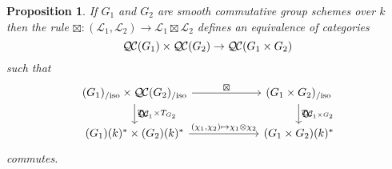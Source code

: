 \documentclass{amsart}
\theoremstyle{plain}
\newtheorem{proposition}[theorem]{Proposition}
\theoremstyle{definition}
\theoremstyle{remark}
\newcommand{\Fq}{k}
\newcommand{\qcs}[1]{{\mathcal{#1}}}
\newcommand{\QC}{{\mathcal{Q\hskip-0.8pt C}}}
\newcommand{\QCiso}[1]{\QC(#1)_{/\text{iso}}}
\newcommand{\TrFrob}[1]{T_{#1}}
\begin{document}

\begin{proposition}\label{prop:product}
If $G_1$ and $G_2$ are smooth commutative group schemes over $\Fq$ then the rule
$\boxtimes : (\qcs{L}_1,\qcs{L}_2)\to \qcs{L}_1\boxtimes\qcs{L}_2$ defines an equivalence of categories
\[
\QC(G_1)\times \QC(G_2) \to \QC(G_1\times G_2)
\]
such that
\[
\begin{tikzcd}[column sep=60]
\arrow{d}{\TrFrob{G_1} \times \TrFrob{G_2}} \QCiso{G_1}\times \QCiso{G_2} \arrow{r}{\boxtimes}
& \arrow{d}{\TrFrob{G_1\times G_2}} \QCiso{G_1\times G_2}\\
(G_1)(\Fq)^*\times (G_2)(\Fq)^* \arrow{r}{(\chi_1,\chi_2)\mapsto \chi_1\otimes \chi_2}  & (G_1\times G_2)(\Fq)^*
\end{tikzcd}
\]
commutes.
\end{proposition}
\end{document}
